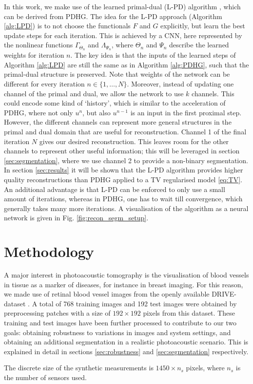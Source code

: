 \documentclass[journal]{IEEEtran}
\newcommand{\hl}[1]{\cbcolor{red}\begin{changebar}{\color{red} #1}\end{changebar}}
\begin{document}
In this work, we make use of the learned primal-dual (L-PD) algorithm \cite{Adler2018}, which can be derived from PDHG. The idea for the L-PD approach (Algorithm \ref{alg:LPD}) is to not choose the functionals $F$ and $G$ explicitly, but learn the best update steps for each iteration. This is achieved by a CNN, here represented by the nonlinear functions {$\Gamma_{\Theta_n}$ and $\Lambda_{\Psi_n}$, where $\Theta_n$ and $\Psi_n$} describe the learned weights for iteration $n$. The key idea is that the inputs of the learned steps of Algorithm \ref{alg:LPD} are still the same as in Algorithm \ref{alg:PDHG}, such that the primal-dual structure is preserved. Note that weights of the network can be different for every iteration $n\in\{1,\dots,N\}$. Moreover, instead of updating one channel of the primal and dual, we allow the network to use $k$ channels. This could encode some kind of `history', which is similar to the acceleration of PDHG, where not only $u^n$, but also $u^{n-1}$ is an input in the first proximal step. However, the different channels can represent more general structures in the primal and dual domain that are useful for reconstruction. {Channel 1 of the final iteration $N$ gives our desired reconstruction. This leaves room for the other channels to represent other useful information; this will be leveraged in section \ref{sec:segmentation}, where we use channel 2 to provide a non-binary segmentation.} In section \ref{sec:results} it will be shown that the L-PD algorithm provides higher quality reconstructions than PDHG applied to a TV regularised model \eqref{eq:TV}. An additional advantage is that L-PD can be enforced to only use a small amount of iterations, whereas in PDHG, one has to wait till convergence, which generally takes many more iterations. {A visualisation of the algorithm as a neural network is given in Fig. \ref{fig:recon_segm_setup}.}

\section{Methodology}\label{sec:experiments}
A major interest in photoacoustic tomography is the visualisation of blood vessels in tissue as a marker of diseases, for instance in breast imaging. For this reason, we made use of retinal blood vessel images from the openly available DRIVE-dataset \cite{Staal2004}. A total of 768 training images and 192 test images were obtained by preprocessing patches with a size of $192\times192$ pixels from this dataset. These training and test images have been further processed to contribute to our two goals: obtaining robustness to variations in images and system settings, and obtaining an additional segmentation in a realistic photoacoustic scenario. This is explained in detail in sections \ref{sec:robustness} and \ref{sec:segmentation} respectively. \hl{The discrete size of the synthetic measurements is $1450\times n_s$ pixels, where $n_s$ is the number of sensors used.}
\end{document}
